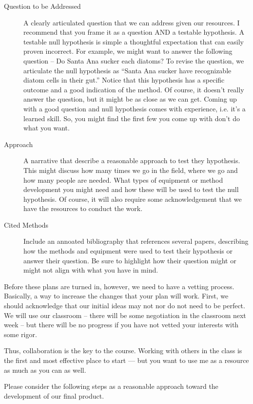 \documentclass{tufte-handout}\usepackage[]{graphicx}\usepackage[]{color}
\begin{document}
\begin{description}
  \item[Question to be Addressed] A clearly articulated question that we can address given our resources. I recommend that you frame it as a question AND a testable hypothesis. A testable null hypothesis is simple a thoughtful expectation that can easily proven incorrect. For example, we might want to answer the following question -- Do Santa Ana sucker each diatoms?  To revise the question, we articulate the null hypothesis as ``Santa Ana sucker have recognizable diatom cells in their gut.'' Notice that this hypothesis has a specific outcome and a good indication of the method. Of course, it doesn't really answer the question, but it might be as close as we can get. Coming up with a good question and null hypothesis comes with experience, i.e. it's a learned skill. So, you might find the first few you come up with don't do what you want.   
  \item[Approach] A narrative that describe a reasonable approach to test they hypothesis. This might discuss how many times we go in the field, where we go and how many people are needed. What types of equipment or method development you might need and how these will be used to test the null hypothesis. Of course, it will also require some acknowledgement that we have the resources to conduct the work. 
  \item[Cited Methods] Include an annoated bibliography that references several papers, describing how the methods and equipment were used to test their hypothesis or answer their question. Be sure to highlight how their question might or might not align with what you have in mind.
\end{description}

Before these plans are turned in, however, we need to have a vetting process. Basically, a way to increase the changes that your plan will work. First, we should acknowledge that our initial ideas may not nor do not need to be perfect. We will use our classroom -- there will be some negotiation in the classroom next week -- but there will be no progress if you have not vetted your interests with some rigor.

Thus, collaboration is the key to the course. Working with others in the class is the first and most effective place to start --- but you want to use me as a resource as much as you can as well. 

Please consider the following steps as a reasonable approach toward the development of our final product. 
\end{document}
